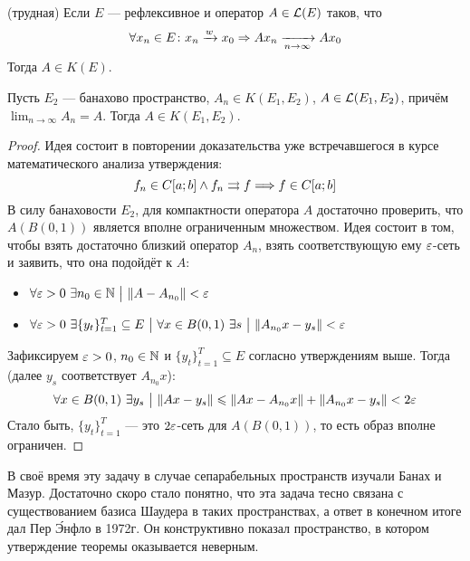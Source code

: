 \begin{task} (трудная)
	Если $E$ --- рефлексивное и оператор $A \in \mathcal{L}(E)$  таков, что
	\[
		\forall x_n \in E \colon x_n \xrightarrow{w} x_0 \Rightarrow Ax_n \xrightarrow[n \to \infty]{} Ax_0
	\]
	Тогда $A \in K(E)$.
\end{task}

\begin{theorem} \label{compact_approx_th}
	Пусть $E_2$ --- банахово пространство, $A_n \in K(E_1, E_2)$, $A \in \mathcal{L}(E_1, E_2)$, причём $\lim_{n \to \infty} A_n = A$. Тогда $A \in K(E_1, E_2)$.
\end{theorem}

\begin{proof}
	Идея состоит в повторении доказательства уже встречавшегося в курсе математического анализа утверждения:
	\[
		f_n \in C[a; b] \wedge f_n \rightrightarrows f \Longrightarrow f \in C[a; b]
	\]
	В силу банаховости $E_2$, для компактности оператора $A$ достаточно проверить, что $A(B(0, 1))$ является вполне ограниченным множеством. Идея состоит в том, чтобы взять достаточно близкий оператор $A_n$, взять соответствующую ему $\varepsilon$-сеть и заявить, что она подойдёт к $A$:
	\begin{itemize}
		\item $\forall \varepsilon > 0\ \exists n_0 \in \mathbb{N} \ \big|\  \|A - A_{n_0}\| < \varepsilon$
		
		\item $\forall \varepsilon > 0\ \exists \{y_t\}_{t = 1}^T \subseteq E \ \big|\  \forall x \in B(0, 1)\ \exists s \ \big|\  \|A_{n_0}x - y_s\| < \varepsilon$
	\end{itemize}
	Зафиксируем $\varepsilon > 0$, $n_0 \in \mathbb{N}$ и $\{y_t\}_{t = 1}^T \subseteq E$ согласно утверждениям выше. Тогда (далее $y_s$ соответствует $A_{n_0}x$):
	\[
		\forall x \in B(0, 1)\ \exists y_s \ \big|\  \|Ax - y_s\| \leqslant \|Ax - A_{n_0}x\| + \|A_{n_0}x - y_s\| < 2\varepsilon
	\]
	Стало быть, $\{y_t\}_{t = 1}^T$ --- это $2\varepsilon$-сеть для $A(B(0, 1))$, то есть образ вполне ограничен.
\end{proof}

\begin{note}
	В своё время эту задачу в случае сепарабельных пространств изучали Банах и Мазур. Достаточно скоро стало понятно, что эта задача тесно связана с существованием базиса Шаудера в таких пространствах, а ответ в конечном итоге дал Пер \'{Э}нфло в 1972г. Он конструктивно показал пространство, в котором утверждение теоремы оказывается неверным.
\end{note}